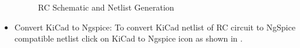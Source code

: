 \begin{itemize}
\begin{figure}[!htp]
    \centering
     \hfill
    \caption{RC Schematic and Netlist Generation}
\end{figure}

\pagebreak
\item Convert KiCad to Ngspice:
To convert KiCad netlist of RC circuit to NgSpice compatible netlist click on KiCad to Ngspice icon as shown in .


\end{itemize}
